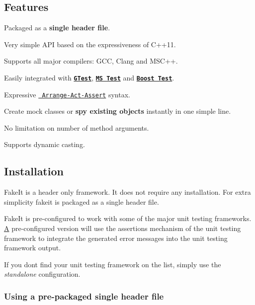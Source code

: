 \subsection*{Features}


\begin{DoxyItemize}
\item Packaged as a {\bfseries{single header file}}.
\item Very simple A\+PI based on the expressiveness of C++11.
\item Supports all major compilers\+: G\+CC, Clang and M\+S\+C++.
\item Easily integrated with \href{https://code.google.com/p/googletest/}{\texttt{ {\bfseries{G\+Test}}}}, \href{http://en.wikipedia.org/wiki/Visual_Studio_Unit_Testing_Framework}{\texttt{ {\bfseries{MS Test}}}} and \href{http://www.boost.org/doc/libs/1_56_0/libs/test/doc/html/index.html}{\texttt{ {\bfseries{Boost Test}}}}.
\item Expressive \href{http://xp123.com/articles/3a-arrange-act-assert/}{\texttt{ Arrange-\/\+Act-\/\+Assert}} syntax.
\item Create mock classes or {\bfseries{spy existing objects}} instantly in one simple line.
\item No limitation on number of method arguments.
\item Supports dynamic casting.
\end{DoxyItemize}

\subsection*{Installation}

Fake\+It is a header only framework. It does not require any installation. For extra simplicity fakeit is packaged as a single header file.

Fake\+It is pre-\/configured to work with some of the major unit testing frameworks. \mbox{\hyperlink{structA}{A}} pre-\/configured version will use the assertions mechanism of the unit testing framework to integrate the generated error messages into the unit testing framework output.

If you don\textquotesingle{}t find your unit testing framework on the list, simply use the {\itshape standalone} configuration.

\subsubsection*{Using a pre-\/packaged single header file}

